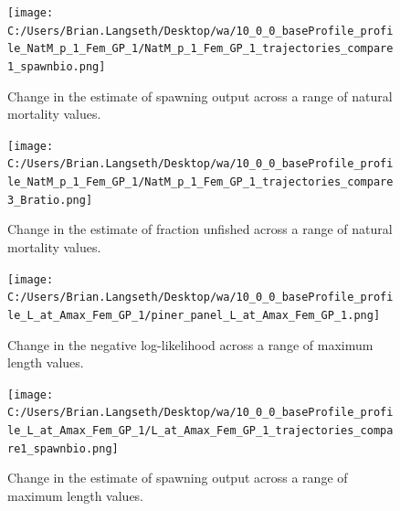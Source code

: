 \documentclass[11pt,
  english,
  letterpaper,
]{article}
\begin{document}
\tagmcend\tagstructend


\begin{figure}
\centering
\texttt{[image: C:/Users/Brian.Langseth/Desktop/wa/10\_0\_0\_baseProfile\_profile\_NatM\_p\_1\_Fem\_GP\_1/NatM\_p\_1\_Fem\_GP\_1\_trajectories\_compare1\_spawnbio.png]}
\caption{Change in the estimate of spawning output across a range of natural mortality values.\label{fig:m-ssb}}
\end{figure}

\tagmcend\tagstructend


\begin{figure}
\centering
\texttt{[image: C:/Users/Brian.Langseth/Desktop/wa/10\_0\_0\_baseProfile\_profile\_NatM\_p\_1\_Fem\_GP\_1/NatM\_p\_1\_Fem\_GP\_1\_trajectories\_compare3\_Bratio.png]}
\caption{Change in the estimate of fraction unfished across a range of natural mortality values.\label{fig:m-depl}}
\end{figure}

\tagmcend\tagstructend


\begin{figure}
\centering
\texttt{[image: C:/Users/Brian.Langseth/Desktop/wa/10\_0\_0\_baseProfile\_profile\_L\_at\_Amax\_Fem\_GP\_1/piner\_panel\_L\_at\_Amax\_Fem\_GP\_1.png]}
\caption{Change in the negative log-likelihood across a range of maximum length values.\label{fig:linf-profile}}
\end{figure}

\tagmcend\tagstructend


\begin{figure}
\centering
\texttt{[image: C:/Users/Brian.Langseth/Desktop/wa/10\_0\_0\_baseProfile\_profile\_L\_at\_Amax\_Fem\_GP\_1/L\_at\_Amax\_Fem\_GP\_1\_trajectories\_compare1\_spawnbio.png]}
\caption{Change in the estimate of spawning output across a range of maximum length values.\label{fig:linf-ssb}}
\end{figure}
\end{document}
